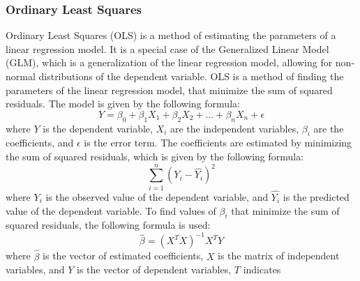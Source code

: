 \documentclass[12pt]{report}
\begin{document}
\subsubsection{Ordinary Least Squares}
Ordinary Least Squares (OLS) is a method of estimating the parameters of a linear regression model. It is a special case of the Generalized Linear Model (GLM), which is a generalization of the linear regression model, allowing for non-normal distributions of the dependent variable. OLS is a method of finding the parameters of the linear regression model, that minimize the sum of squared residuals. The model is given by the following formula:
\begin{equation}
	Y = \beta_0 + \beta_1 X_1 + \beta_2 X_2 + ... + \beta_n X_n + \epsilon
\end{equation}
where $Y$ is the dependent variable, $X_i$ are the independent variables, $\beta_i$ are the coefficients, and $\epsilon$ is the error term. The coefficients are estimated by minimizing the sum of squared residuals, which is given by the following formula:
\begin{equation}
	\sum_{i=1}^{n} (Y_i - \hat{Y_i})^2
\end{equation}
where $Y_i$ is the observed value of the dependent variable, and $\hat{Y_i}$ is the predicted value of the dependent variable. To find values of \(\beta_i\) that minimize the sum of squared residuals, the following formula is used:
\begin{equation}
	\hat{\beta} = (X^T X)^{-1} X^T Y
\end{equation}
where $\hat{\beta}$ is the vector of estimated coefficients, $X$ is the matrix of independent variables, and $Y$ is the vector of dependent variables, $T$ indicates
\end{document}
